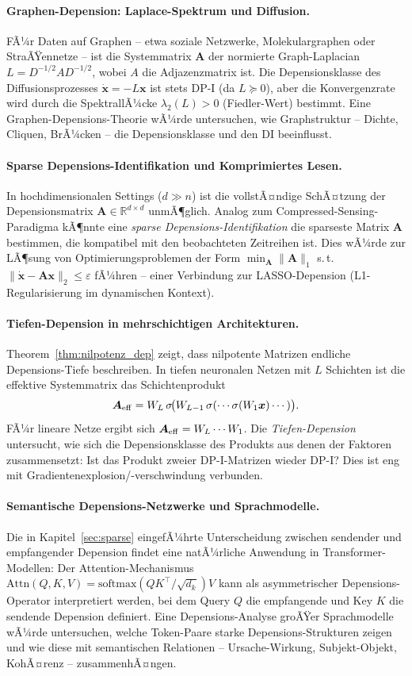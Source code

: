 ﻿\documentclass[12pt, a4paper]{article}
\theoremstyle{definition}
\theoremstyle{remark}
\newcommand{\R}{\mathbb{R}}
\newcommand{\vx}{\bm{x}}
\newcommand{\vA}{\bm{A}}
\newcommand{\T}{\top}
\begin{document}
\paragraph{Graphen-Depension: Laplace-Spektrum und Diffusion.}
FÃ¼r Daten auf Graphen -- etwa soziale Netzwerke, Molekulargraphen oder StraÃŸennetze
-- ist die Systemmatrix $\vA$ der normierte Graph-Laplacian $L = D^{-1/2}AD^{-1/2}$,
wobei $A$ die Adjazenzmatrix ist. Die Depensionsklasse des Diffusionsprozesses
$\dot{\vx} = -L\vx$ ist stets DP-I (da $L \succeq 0$), aber die Konvergenzrate
wird durch die SpektrallÃ¼cke $\lambda_2(L) > 0$ (Fiedler-Wert) bestimmt. Eine
Graphen-Depensions-Theorie wÃ¼rde untersuchen, wie Graphstruktur -- Dichte, Cliquen,
BrÃ¼cken -- die Depensionsklasse und den DI beeinflusst.

\paragraph{Sparse Depensions-Identifikation und Komprimiertes Lesen.}
In hochdimensionalen Settings ($d \gg n$) ist die vollstÃ¤ndige SchÃ¤tzung der
Depensionsmatrix $\vA \in \R^{d \times d}$ unmÃ¶glich. Analog zum Compressed-Sensing-
Paradigma kÃ¶nnte eine \emph{sparse Depensions-Identifikation} die sparseste Matrix
$\vA$ bestimmen, die kompatibel mit den beobachteten Zeitreihen ist. Dies wÃ¼rde zur
LÃ¶sung von Optimierungsproblemen der Form
$\min_{\vA} \|\vA\|_1$ s.\,t.\ $\|\dot{\vx} - \vA\vx\|_2 \leq \varepsilon$
fÃ¼hren -- einer Verbindung zur LASSO-Depension
(L1-Regularisierung im dynamischen Kontext).

\paragraph{Tiefen-Depension in mehrschichtigen Architekturen.}
Theorem~\ref{thm:nilpotenz_dep} zeigt, dass nilpotente Matrizen endliche
Depensions-Tiefe beschreiben. In tiefen neuronalen Netzen mit $L$ Schichten ist
die effektive Systemmatrix das Schichtenprodukt
\[
  \vA_{\rm eff} = W_L\,\sigma\!\bigl(W_{L-1}\,\sigma(\cdots\sigma(W_1 \vx)\cdots)\bigr).
\]
FÃ¼r lineare Netze ergibt sich $\vA_{\rm eff} = W_L\cdots W_1$. Die
\emph{Tiefen-Depension} untersucht, wie sich die Depensionsklasse des Produkts
aus denen der Faktoren zusammensetzt: Ist das Produkt zweier DP-I-Matrizen
wieder DP-I? Dies ist eng mit Gradientenexplosion/-verschwindung verbunden.

\paragraph{Semantische Depensions-Netzwerke und Sprachmodelle.}
Die in Kapitel~\ref{sec:sparse} eingefÃ¼hrte Unterscheidung zwischen sendender und
empfangender Depension findet eine natÃ¼rliche Anwendung in Transformer-Modellen:
Der Attention-Mechanismus $\mathrm{Attn}(Q,K,V) = \mathrm{softmax}(QK^\T/\sqrt{d_k})V$
kann als asymmetrischer Depensions-Operator interpretiert werden, bei dem Query $Q$
die empfangende und Key $K$ die sendende Depension definiert. Eine Depensions-Analyse
groÃŸer Sprachmodelle wÃ¼rde untersuchen, welche Token-Paare starke Depensions-Strukturen
zeigen und wie diese mit semantischen Relationen -- Ursache-Wirkung, Subjekt-Objekt,
KohÃ¤renz -- zusammenhÃ¤ngen.
\end{document}
